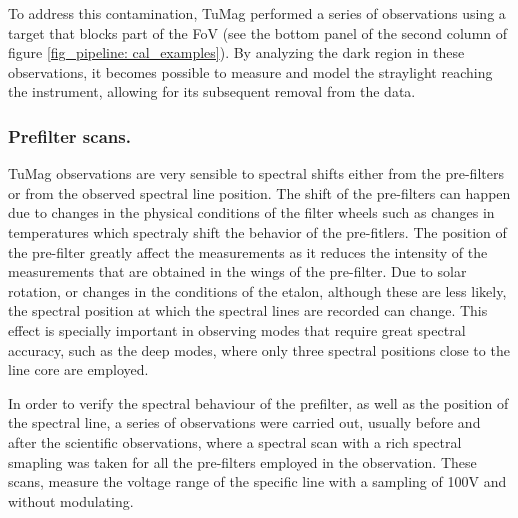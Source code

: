 To address this contamination, TuMag performed a series of observations using a target that blocks part of the FoV (see the bottom panel of the second column of figure \ref{fig_pipeline: cal_examples}). By analyzing the dark region in these observations, it becomes possible to measure and model the straylight reaching the instrument, allowing for its subsequent removal from the data.

\subsubsection{\label{ref:spectral_scans}Prefilter scans.}

TuMag observations are very sensible to spectral shifts either from the pre-filters or from the observed spectral line position. The shift of the pre-filters can happen due to changes in the physical conditions of the filter wheels such as changes in temperatures which spectraly shift the behavior of the pre-fitlers. The position of the pre-filter greatly affect the measurements as it reduces the intensity of the measurements that are obtained in the wings of the pre-filter. Due to solar rotation, or changes in the conditions of the etalon, although these are less likely, the spectral position at which the spectral lines are recorded can change. This effect is specially important in observing modes that require great spectral accuracy, such as the deep modes, where only three spectral positions close to the line core are employed. 

In order to verify the spectral behaviour of the prefilter, as well as the position of the spectral line, a series of observations were carried out, usually before and after the scientific observations, where a spectral scan with a rich spectral smapling was taken for all the pre-filters employed in the observation. These scans, measure the voltage range of the specific line with a sampling of 100V and without modulating. 

